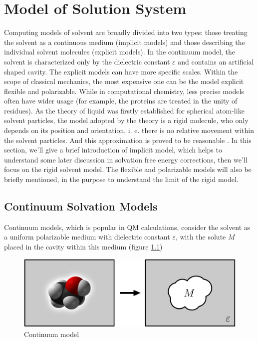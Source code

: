 
\chapter{Model of Solution System\label{chpt:models}}

Computing models of solvent are broadly divided into two types: those
treating the solvent as a continuous medium (implicit models) and
those describing the individual solvent molecules (explicit models).
In the continuum model, the solvent is characterized only by the dielectric
constant $\varepsilon$ and contains an artificial shaped cavity.
The explicit models can have more specific scales. Within the scope
of classical mechanics, the most expensive one can be the model explicit
flexible and polarizable. While in computational chemistry, less precise
models often have wider usage (for example, the proteins are treated
in the unity of residues). As the theory of liquid was firstly established
for spherical atom-like solvent particles, the model adopted by the
theory is a rigid molecule, who only depends on its position and orientation,
i. e. there is no relative movement within the solvent particles.
And this approximation is proved to be reasonable \citep{Gray-Gubbins}.
In this section, we'll give a brief introduction of implicit model,
which helps to understand some later discussion in solvation free
energy corrections, then we'll focus on the rigid solvent model. The
flexible and polarizable models will also be briefly mentioned, in
the purpose to understand the limit of the rigid model. 


\section{Continuum Solvation Models}

Continuum models, which is popular in QM calculations, consider the
solvent as a uniform polarizable medium with dielectric constant $\varepsilon$,
with the solute $M$ placed in the cavity within this medium \citep{Jensen}
(figure \ref{fig:Reaction-field-model}) 

\begin{figure}[h]
\begin{centering}
\includegraphics[width=0.75\columnwidth]{_figure/reaction-field-model_2}
\par\end{centering}

\caption{Continuum model\label{fig:Reaction-field-model}}
\end{figure}


